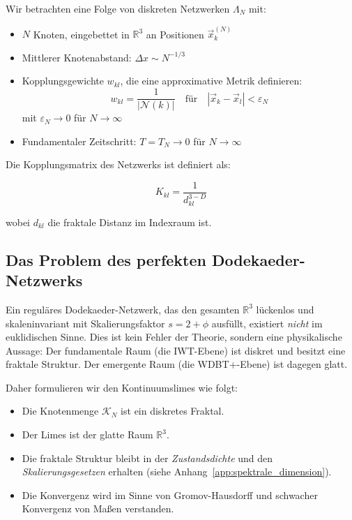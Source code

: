 Wir betrachten eine Folge von diskreten Netzwerken \( \Lambda_N \) mit:

\begin{itemize}
    \item \( N \) Knoten, eingebettet in \( \mathbb{R}^3 \) an Positionen \( \vec{x}_k^{(N)} \)
    \item Mittlerer Knotenabstand: \( \Delta x \sim N^{-1/3} \)
    \item Kopplungsgewichte \( w_{kl} \), die eine approximative Metrik definieren:
          \[
          w_{kl} = \frac{1}{|\mathcal{N}(k)|} \quad \text{für} \quad |\vec{x}_k - \vec{x}_l| < \varepsilon_N
          \]
          mit \( \varepsilon_N \to 0 \) für \( N \to \infty \)
    \item Fundamentaler Zeitschritt: \( T = T_N \to 0 \) für \( N \to \infty \)
\end{itemize}

Die Kopplungsmatrix des Netzwerks ist definiert als:

\[
K_{kl} = \frac{1}{d_{kl}^{3-D}}
\]

wobei \( d_{kl} \) die fraktale Distanz im Indexraum ist.

\subsection{Das Problem des perfekten Dodekaeder-Netzwerks}
\label{sub:kontinuumslimes_dodekaeder_problem}

Ein reguläres Dodekaeder-Netzwerk, das den gesamten \( \mathbb{R}^3 \) lückenlos und skaleninvariant mit Skalierungsfaktor \( s = 2+\phi \) ausfüllt, existiert \emph{nicht} im euklidischen Sinne. Dies ist kein Fehler der Theorie, sondern eine physikalische Aussage: Der fundamentale Raum (die IWT-Ebene) ist diskret und besitzt eine fraktale Struktur. Der emergente Raum (die WDBT+-Ebene) ist dagegen glatt.

Daher formulieren wir den Kontinuumslimes wie folgt:
\begin{itemize}
    \item Die Knotenmenge \( \mathcal{K}_N \) ist ein diskretes Fraktal.
    \item Der Limes ist der glatte Raum \( \mathbb{R}^3 \).
    \item Die fraktale Struktur bleibt in der \emph{Zustandsdichte} und den \emph{Skalierungsgesetzen} erhalten (siehe Anhang~\ref{app:spektrale_dimension}).
    \item Die Konvergenz wird im Sinne von Gromov-Hausdorff und schwacher Konvergenz von Maßen verstanden.
\end{itemize}

